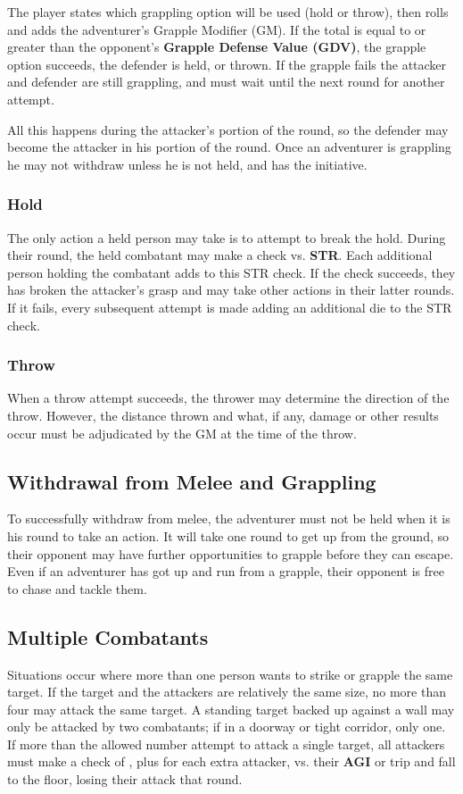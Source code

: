 \begin{multicols*}{2}
The player states which grappling option will be used (hold or throw), then rolls  and adds the adventurer's Grapple Modifier (GM). If the total is equal to or greater than the opponent's \textbf{Grapple Defense Value (GDV)}, the grapple option succeeds, the defender is held, or thrown. If the grapple fails the attacker and defender are still grappling, and must wait until the next round for another attempt.

All this happens during the attacker's portion of the round, so the defender may become the attacker in his portion of the round. Once an adventurer is grappling he may not withdraw unless he is not held, and has the initiative.
\subsubsection{Hold}
The only action a held person may take is to attempt to break the hold. During their round, the held combatant may make a  check vs. \textbf{STR}. Each additional person holding the combatant adds  to this STR check. If the check succeeds, they has broken the attacker's grasp and may take other actions in their latter rounds. If it fails, every subsequent attempt is made adding an additional die to the STR check.
\subsubsection{Throw}
When a throw attempt succeeds, the thrower may determine the direction of the throw. However, the distance thrown and what, if any, damage or other results occur must be adjudicated by the GM at the time of the throw.
\subsection{Withdrawal from Melee and Grappling}
To successfully withdraw from melee, the adventurer must not be held when it is his round to take an action. It will take one round to get up from the ground, so their opponent may have further opportunities to grapple before they can escape. Even if an adventurer has got up and run from a grapple, their opponent is free to chase and tackle them.
\subsection{Multiple Combatants}
Situations occur where more than one person wants to strike or grapple the same target. If the target and the attackers are relatively the same size, no more than four may attack the same target. A standing target backed up against a wall may only be attacked by two combatants; if in a doorway or tight corridor, only one. If more than the allowed number attempt to attack a single target, all attackers must make a check of , plus  for each extra attacker, vs. their \textbf{AGI} or trip and fall to the floor, losing their attack that round.


\end{multicols*}
